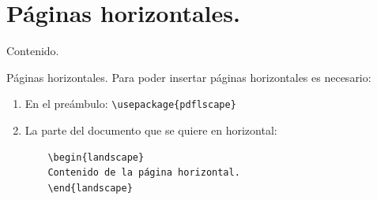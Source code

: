 \documentclass[dvipsnames,xcolor, handout]{beamer}
\theoremstyle{plain}
\theoremstyle{definition}
\begin{document}
\section{Páginas horizontales.}
\begin{frame}{Contenido.}
  \begin{footnotesize}
\vspace*{-1cm}
\begin{multicols}{2}
  \tableofcontents[currentsection]
\end{multicols}
\end{footnotesize}
\end{frame}

\begin{frame}[fragile]{Páginas horizontales.}
    Para poder insertar páginas horizontales es necesario:
    \begin{enumerate}
        \item En el preámbulo: \verb!\usepackage{pdflscape}!
        \item La parte del documento que se quiere en horizontal:
\begin{verbatim}
    \begin{landscape}
    Contenido de la página horizontal.
    \end{landscape}
\end{verbatim}
    \end{enumerate}
\end{frame}
 
\end{document}

